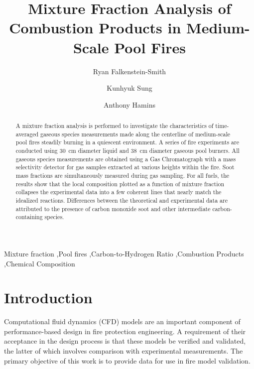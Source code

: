 \documentclass[preprint,review,12pt]{elsarticle}
\begin{document}
\begin{frontmatter}

\title{Mixture Fraction Analysis of Combustion Products in Medium-Scale Pool Fires}

\author{Ryan Falkenstein-Smith}

\author{Kunhyuk Sung}
\author{Anthony Hamins}

\address{National Institute of Standards and Technology, 100 Bureau Dr., Gaithersburg, MD 20899, United States of America}

\begin{abstract}
A mixture fraction analysis is performed to investigate the characteristics of time-averaged gaseous species measurements made along the centerline of medium-scale pool fires steadily burning in a quiescent environment. A series of fire experiments are conducted using 30~cm diameter liquid and 38~cm diameter gaseous pool burners. All gaseous species measurements are obtained using a Gas Chromatograph with a mass selectivity detector for gas samples extracted at various heights within the fire. Soot mass fractions are simultaneously measured during gas sampling. For all fuels, the results show that the local composition plotted as a function of mixture fraction collapses the experimental data into a few coherent lines that nearly match the idealized reactions. Differences between the theoretical and experimental data are attributed to the presence of carbon monoxide soot and other intermediate carbon-containing species.
\end{abstract}

\begin{keyword}

Mixture fraction \sep Pool fires \sep Carbon-to-Hydrogen Ratio \sep Combustion Products \sep Chemical Composition

\end{keyword}

\end{frontmatter}


\ifdefined \wordcount
\clearpage
\fi

\section{Introduction}
\label{Introduction}
Computational fluid dynamics (CFD) models are an important component of performance-based design in fire protection engineering. A requirement of their acceptance in the design process is that these models be verified and validated, the latter of which involves comparison with experimental measurements. The primary objective of this work is to provide data for use in fire model validation. 
\end{document}
